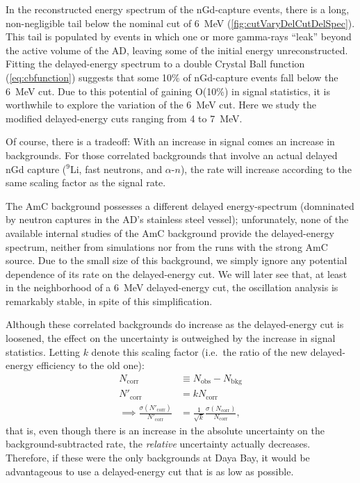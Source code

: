 \documentclass[../thesis.tex]{subfiles}
\begin{document}
In the reconstructed energy spectrum of the nGd-capture events, there is a long, non-negligible tail below the nominal cut of 6~MeV (\autoref{fig:cutVaryDelCutDelSpec}). This tail is populated by events in which one or more gamma-rays ``leak'' beyond the active volume of the AD, leaving some of the initial energy unreconstructed. Fitting the delayed-energy spectrum to a double Crystal Ball function (\autoref{eq:cbfunction}) suggests that some 10\% of nGd-capture events fall below the 6~MeV cut. Due to this potential of gaining O(10\%) in signal statistics, it is worthwhile to explore the variation of the 6~MeV cut. Here we study the modified delayed-energy cuts ranging from 4 to 7~MeV.

Of course, there is a tradeoff: With an increase in signal comes an increase in backgrounds. For those correlated backgrounds that involve an actual delayed nGd capture ($^9$Li, fast neutrons, and $\alpha$-$n$), the rate will increase according to the same scaling factor as the signal rate.

The AmC background possesses a different delayed energy-spectrum (domninated by neutron captures in the AD's stainless steel vessel); unforunately, none of the available internal studies of the AmC background provide the delayed-energy spectrum, neither from simulations nor from the runs with the strong AmC source. Due to the small size of this background, we simply ignore any potential dependence of its rate on the delayed-energy cut. We will later see that, at least in the neighborhood of a 6~MeV delayed-energy cut, the oscillation analysis is remarkably stable, in spite of this simplification.

Although these correlated backgrounds do increase as the delayed-energy cut is loosened, the effect on the uncertainty is outweighed by the increase in signal statistics. Letting $k$ denote this scaling factor (i.e.\ the ratio of the new delayed-energy efficiency to the old one):
\begin{align}
  \label{eq:cutVaryDelayedNcorrSigma}
  N_{\mathrm{corr}} &\equiv N_{\mathrm{obs}} - N_{\mathrm{bkg}} \\
  N'_{\mathrm{corr}} &= k N_{\mathrm{corr}} \\
  \implies \frac{\sigma(N'_{\mathrm{corr}})}{N'_{\mathrm{corr}}} &= \frac{1}{\sqrt{k}} \frac{\sigma(N_{\mathrm{corr}})}{N_{\mathrm{corr}}},
\end{align}
that is, even though there is an increase in the absolute uncertainty on the background-subtracted rate, the \emph{relative} uncertainty actually decreases. Therefore, if these were the only backgrounds at Daya Bay, it would be advantageous to use a delayed-energy cut that is as low as possible.
\end{document}
